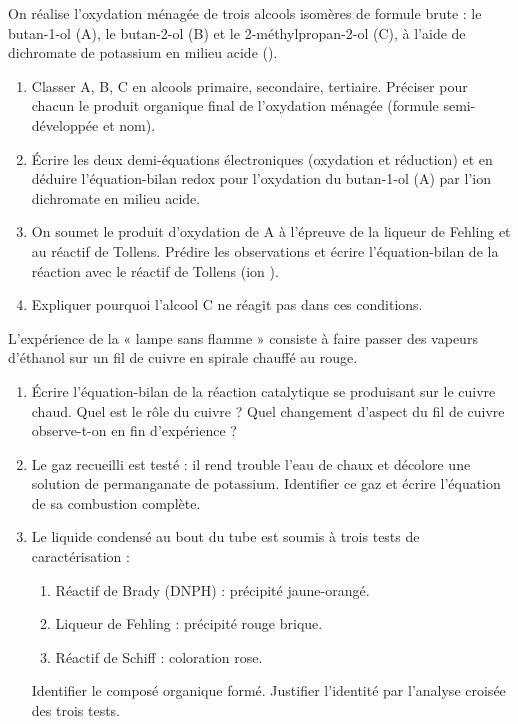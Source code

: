 \documentclass[11pt]{article}
\begin{document}
\begin{exercice}
On réalise l'oxydation ménagée de trois alcools isomères de formule brute  : le butan-1-ol (A), le butan-2-ol (B) et le 2-méthylpropan-2-ol (C), à l'aide de dichromate de potassium en milieu acide ().
\begin{enumerate}
    \item Classer A, B, C en alcools primaire, secondaire, tertiaire. Préciser pour chacun le produit organique final de l'oxydation ménagée (formule semi-développée et nom).
    \item Écrire les deux demi-équations électroniques (oxydation et réduction) et en déduire l'équation-bilan redox pour l'oxydation du butan-1-ol (A) par l'ion dichromate en milieu acide.
    \item On soumet le produit d'oxydation de A à l'épreuve de la liqueur de Fehling et au réactif de Tollens. Prédire les observations et écrire l'équation-bilan de la réaction avec le réactif de Tollens (ion ).
    \item Expliquer pourquoi l'alcool C ne réagit pas dans ces conditions.
\end{enumerate}
\end{exercice}

\begin{exercice}
L'expérience de la « lampe sans flamme » consiste à faire passer des vapeurs d'éthanol sur un fil de cuivre en spirale chauffé au rouge.
\begin{enumerate}
    \item Écrire l'équation-bilan de la réaction catalytique se produisant sur le cuivre chaud. Quel est le rôle du cuivre ? Quel changement d'aspect du fil de cuivre observe-t-on en fin d'expérience ?
    \item Le gaz recueilli est testé : il rend trouble l'eau de chaux et décolore une solution de permanganate de potassium. Identifier ce gaz et écrire l'équation de sa combustion complète.
    \item Le liquide condensé au bout du tube est soumis à trois tests de caractérisation :
    \begin{enumerate}
        \item Réactif de Brady (DNPH) : précipité jaune-orangé.
        \item Liqueur de Fehling : précipité rouge brique.
        \item Réactif de Schiff : coloration rose.
    \end{enumerate}
    Identifier le composé organique formé. Justifier l'identité par l'analyse croisée des trois tests.
\end{enumerate}
\end{exercice}
\end{document}
